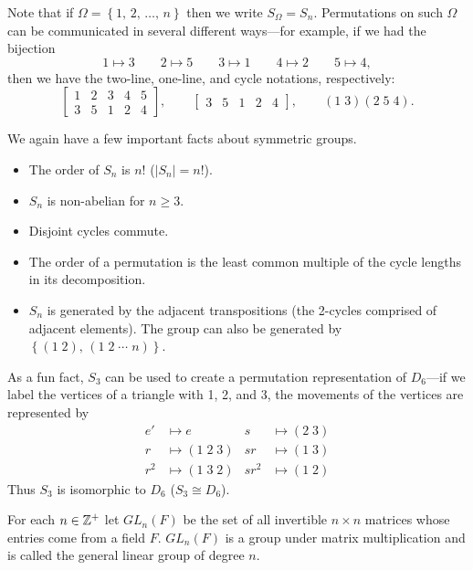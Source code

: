 \documentclass[../m171main.tex]{subfiles}
\begin{document}
Note that if $\Omega = \left\{ 1, \, 2, \, \ldots, \, n \right\}$ then we write $S_\Omega = S_n$.
Permutations on such $\Omega$ can be communicated in several different ways---for example, if we had the bijection
\[ 1 \mapsto 3 \qquad 2 \mapsto 5 \qquad 3 \mapsto 1 \qquad 4 \mapsto 2 \qquad 5 \mapsto 4, \]
then we have the two-line, one-line, and cycle notations, respectively:
\[ \begin{bmatrix} 1 & 2 & 3 & 4 & 5 \\ 3 & 5 & 1 & 2 & 4 \end{bmatrix}, \qquad \begin{bmatrix} 3 & 5 & 1 & 2 & 4 \end{bmatrix}, \qquad (1 \; 3)(2 \; 5 \; 4). \]



We again have a few important facts about symmetric groups.
\begin{itemize}
    \item The order of $S_n$ is $n!$ ($|S_n| = n!$).
    \item $S_n$ is non-abelian for $n \geq 3$.
    \item Disjoint cycles commute.
    \item The order of a permutation is the least common multiple of the cycle lengths in its decomposition.
    \item $S_n$ is generated by the adjacent transpositions (the 2-cycles comprised of adjacent elements).
    The group can also be generated by $\left\{ (1 \; 2), \, (1 \; 2 \; \cdots \; n) \right\}$.
\end{itemize}
As a fun fact, $S_3$ can be used to create a permutation representation of $D_6$---if we label the vertices of a triangle with 1, 2, and 3, the movements of the vertices are represented by
\begin{align*}
    e' &\mapsto e & s &\mapsto (2 \; 3) \\
    r &\mapsto (1 \; 2 \; 3) & sr &\mapsto (1 \; 3) \\
    r^2 &\mapsto (1 \; 3 \; 2) & sr^2 &\mapsto (1 \; 2)
\end{align*}
Thus $S_3$ is isomorphic to $D_6$ ($S_3 \cong D_6$).

\begin{definition}
    For each $n \in \mathbb{Z}^+$ let $GL_n(F)$ be the set of all invertible $n \times n$ matrices whose entries come from a field $F$.
    $GL_n(F)$ is a group under matrix multiplication and is called the general linear group of degree $n$.
\end{definition}
\end{document}
